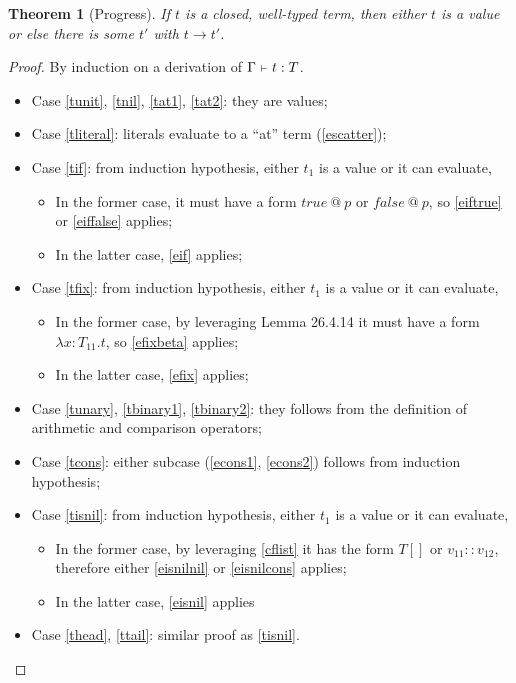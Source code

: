 \documentclass{report}
\makeatletter
\newtheorem{theorem}{Theorem}
\newtheorem{proof}{Proof}
\newcommand{\at}{~\texttt{@}~}
\newcommand{\ty}{{:}}
\newcommand{\type}{:}
\newcommand{\ctx}{~\mathsmaller\vdash~}
\newcommand{\ctxtype}[2]{\Gamma\ctx #1 \type #2}
\makeatother
\begin{document}
\begin{theorem}[Progress]
  If $t$ is a closed, well-typed term, then either $t$ is a
  value or else there is some $t'$ with $t\longrightarrow t'$.
\end{theorem}
\begin{proof}
  By induction on a derivation of $\ctxtype{t}{T}$.
  \begin{itemize}
    \item Case \ref{tunit}, \ref{tnil}, \ref{tat1}, \ref{tat2}: they are values;
    \item Case \ref{tliteral}: literals evaluate to a ``at'' term (\ref{escatter});
    \item Case \ref{tif}: from induction hypothesis, either $t_1$ is a value or it can evaluate,
    \begin{itemize}
      \item In the former case, it must have a form $true\at p$ or $false\at p$, so \ref{eiftrue} or \ref{eiffalse} applies;
      \item In the latter case, \ref{eif} applies;
    \end{itemize}
    \item Case \ref{tfix}: from induction hypothesis, either $t_1$ is a value or it can evaluate,
    \begin{itemize}
      \item In the former case, by leveraging Lemma 26.4.14 it must have a form $\lambda x\ty T_{11}.t$, so \ref{efixbeta} applies;
      \item In the latter case, \ref{efix} applies;
    \end{itemize}
    \item Case \ref{tunary}, \ref{tbinary1}, \ref{tbinary2}: they follows from the definition of arithmetic and comparison operators;
    \item Case \ref{tcons}: either subcase (\ref{econs1}, \ref{econs2}) follows from induction hypothesis;
    \item Case \ref{tisnil}: from induction hypothesis, either $t_1$ is a value or it can evaluate,
    \begin{itemize}
      \item In the former case, by leveraging \ref{cflist} it has the form $T[]$ or $v_{11} :: v_{12}$, therefore either \ref{eisnilnil} or \ref{eisnilcons} applies;
      \item In the latter case, \ref{eisnil} applies
    \end{itemize}
    \item Case \ref{thead}, \ref{ttail}: similar proof as \ref{tisnil}.
  \end{itemize}
\end{proof}
\end{document}
